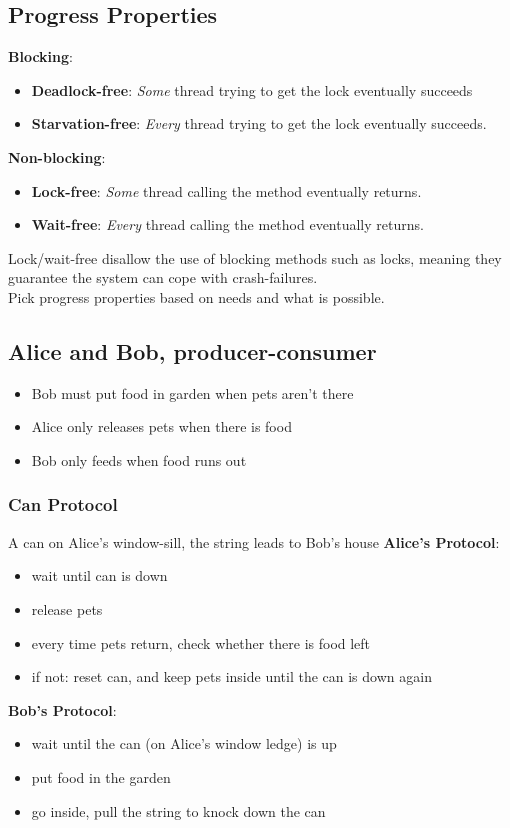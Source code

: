 \documentclass{article}
\begin{document}
\subsection{Progress Properties}
\textbf{Blocking}:
\begin{itemize}
    \item \textbf{Deadlock-free}: \textit{Some} thread trying to get the lock eventually succeeds
    \item \textbf{Starvation-free}: \textit{Every} thread trying to get the lock eventually succeeds.
\end{itemize}
\textbf{Non-blocking}:
\begin{itemize}
    \item \textbf{Lock-free}: \textit{Some} thread calling the method eventually returns.
    \item \textbf{Wait-free}: \textit{Every} thread calling the method eventually returns.
\end{itemize}
Lock/wait-free disallow the use of blocking methods such as locks, meaning they guarantee the system can cope with crash-failures.
\\Pick progress properties based on needs and what is possible.
\subsection{Alice and Bob, producer-consumer}
\begin{itemize}
    \item Bob must put food in garden when pets aren't there
    \item Alice only releases pets when there is food
    \item Bob only feeds when food runs out
\end{itemize}
\subsubsection{Can Protocol}
A can on Alice's window-sill, the string leads to Bob's house
\textbf{Alice's Protocol}:
\begin{itemize}
    \item wait until can is down
    \item release pets
    \item every time pets return, check whether there is food left
    \item if not: reset can, and keep pets inside until the can is down again
\end{itemize}
\textbf{Bob's Protocol}:
\begin{itemize}
    \item wait until the can (on Alice's window ledge) is up
    \item put food in the garden
    \item go inside, pull the string to knock down the can
\end{itemize}
\end{document}
